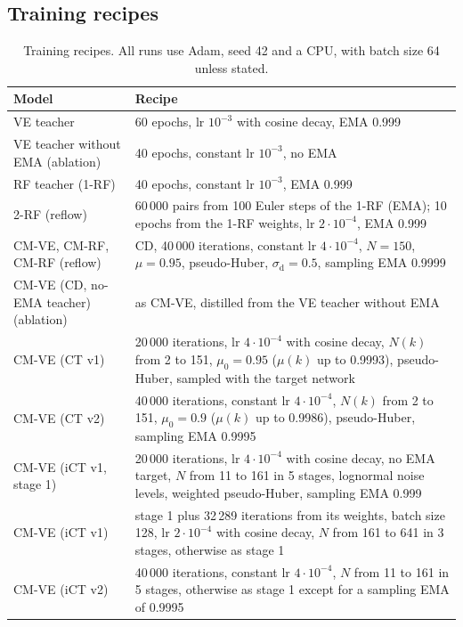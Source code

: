 \documentclass{article}
\begin{document}
\subsection{Training recipes}
\label{sec:app_recipes}

\begin{table}[H]
  \caption{Training recipes. All runs use Adam, seed 42 and a CPU, with batch
  size 64 unless stated.}
  \label{tab:recipes}
  \centering
  \footnotesize
  \begin{tabular}{p{3.4cm}p{8.9cm}}
    \toprule
    Model & Recipe \\
    \midrule
    VE teacher & 60 epochs, lr $10^{-3}$ with cosine decay, EMA 0.999 \\
    VE teacher without EMA (ablation) & 40 epochs, constant lr $10^{-3}$, no EMA \\
    RF teacher (1-RF) & 40 epochs, constant lr $10^{-3}$, EMA 0.999 \\
    2-RF (reflow) & 60\,000 pairs from 100 Euler steps of the 1-RF (EMA); 10 epochs from the 1-RF weights, lr $2\cdot10^{-4}$, EMA 0.999 \\
    CM-VE, CM-RF, CM-RF (reflow) & CD, 40\,000 iterations, constant lr $4\cdot10^{-4}$, $N = 150$, $\mu = 0.95$, pseudo-Huber, $\sigma_\text{d} = 0.5$, sampling EMA 0.9999 \\
    CM-VE (CD, no-EMA teacher) (ablation) & as CM-VE, distilled from the VE teacher without EMA \\
    CM-VE (CT v1) & 20\,000 iterations, lr $4\cdot10^{-4}$ with cosine decay, $N(k)$ from 2 to 151, $\mu_0 = 0.95$ ($\mu(k)$ up to 0.9993), pseudo-Huber, sampled with the target network \\
    CM-VE (CT v2) & 40\,000 iterations, constant lr $4\cdot10^{-4}$, $N(k)$ from 2 to 151, $\mu_0 = 0.9$ ($\mu(k)$ up to 0.9986), pseudo-Huber, sampling EMA 0.9995 \\
    CM-VE (iCT v1, stage 1) & 20\,000 iterations, lr $4\cdot10^{-4}$ with cosine decay, no EMA target, $N$ from 11 to 161 in 5 stages, lognormal noise levels, weighted pseudo-Huber, sampling EMA 0.999 \\
    CM-VE (iCT v1) & stage 1 plus 32\,289 iterations from its weights, batch size 128, lr $2\cdot10^{-4}$ with cosine decay, $N$ from 161 to 641 in 3 stages, otherwise as stage 1 \\
    CM-VE (iCT v2) & 40\,000 iterations, constant lr $4\cdot10^{-4}$, $N$ from 11 to 161 in 5 stages, otherwise as stage 1 except for a sampling EMA of 0.9995 \\
    \bottomrule
  \end{tabular}
\end{table}
\end{document}
